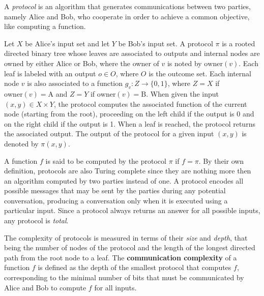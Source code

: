 A \textit{protocol} is an algorithm that generates communications between two parties, namely Alice and Bob, who cooperate in order to achieve a common objective, like computing a function.

\begin{definition}
    Let $X$ be Alice's input set and let $Y$ be Bob's input set. A protocol $\pi$ is a rooted directed binary tree whose leaves are associated to outputs and internal nodes are owned by either Alice or Bob, where the owner of $v$ is noted by $\mathrm{owner}(v)$. Each leaf is labeled with an output $o \in O$, where $O$ is the outcome set. Each internal node $v$ is also associated to a function $g_v : Z \to \{0,1\}$, where $Z = X$ if $\mathrm{owner}(v) = \mathrm{A}$ and $Z = Y$ if $\mathrm{owner}(v) = \mathrm{B}$. When given the input $(x,y) \in X \times Y$, the protocol computes the associated function of the current node (starting from the root), proceeding on the left child if the output is 0 and on the right child if the output is 1. When a leaf is reached, the protocol returns the associated output. The output of the protocol for a given input $(x,y)$ is denoted by $\pi(x,y)$.
\end{definition}

A function $f$ is said to be computed by the protocol $\pi$ if $f = \pi$. By their own definition, protocols are also Turing complete since they are nothing more then an algorithm computed by two parties instead of one. A protocol encodes all possible messages that may be sent by the parties during any potential conversation, producing a conversation only when it is executed using a particular input. Since a protocol always returns an answer for all possible inputs, any protocol is \textit{total}.

The complexity of protocols is measured in terms of their \textit{size} and \textit{depth}, that being the number of nodes of the protocol and the length of the longest directed path from the root node to a leaf. The \textbf{communication complexity} of a function $f$ is defined as the depth of the smallest protocol that computes $f$, corresponding to the minimal number of bits that must be communicated by Alice and Bob to compute $f$ for all inputs.

